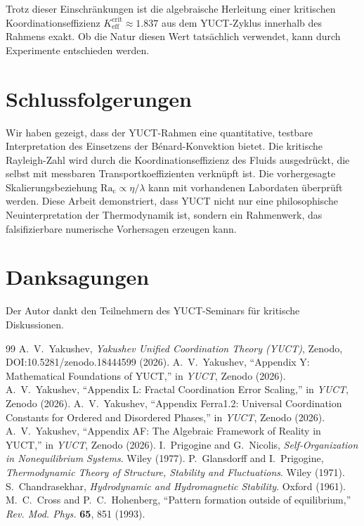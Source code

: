 \documentclass[12pt,a4paper]{article}
\begin{document}
	Trotz dieser Einschränkungen ist die algebraische Herleitung einer kritischen Koordinationseffizienz \(K_{\mathrm{eff}}^{\mathrm{crit}} \approx 1.837\) aus dem YUCT-Zyklus innerhalb des Rahmens exakt. Ob die Natur diesen Wert tatsächlich verwendet, kann durch Experimente entschieden werden.
	
	\section{Schlussfolgerungen}
	
	Wir haben gezeigt, dass der YUCT-Rahmen eine quantitative, testbare Interpretation des Einsetzens der Bénard-Konvektion bietet. Die kritische Rayleigh-Zahl wird durch die Koordinationseffizienz des Fluids ausgedrückt, die selbst mit messbaren Transportkoeffizienten verknüpft ist. Die vorhergesagte Skalierungsbeziehung \(\mathrm{Ra_c} \propto \eta/\lambda\) kann mit vorhandenen Labordaten überprüft werden. Diese Arbeit demonstriert, dass YUCT nicht nur eine philosophische Neuinterpretation der Thermodynamik ist, sondern ein Rahmenwerk, das falsifizierbare numerische Vorhersagen erzeugen kann.
	
	\section*{Danksagungen}
	Der Autor dankt den Teilnehmern des YUCT-Seminars für kritische Diskussionen.
	
	\begin{thebibliography}{99}
		 A.~V.~Yakushev, \emph{Yakushev Unified Coordination Theory (YUCT)}, Zenodo, DOI:10.5281/zenodo.18444599 (2026).
		 A.~V.~Yakushev, ``Appendix Y: Mathematical Foundations of YUCT,'' in \emph{YUCT}, Zenodo (2026).
		 A.~V.~Yakushev, ``Appendix L: Fractal Coordination Error Scaling,'' in \emph{YUCT}, Zenodo (2026).
		 A.~V.~Yakushev, ``Appendix Ferra1.2: Universal Coordination Constants for Ordered and Disordered Phases,'' in \emph{YUCT}, Zenodo (2026).
		 A.~V.~Yakushev, ``Appendix AF: The Algebraic Framework of Reality in YUCT,'' in \emph{YUCT}, Zenodo (2026).
		 I.~Prigogine and G.~Nicolis, \emph{Self‑Organization in Nonequilibrium Systems}. Wiley (1977).
		 P.~Glansdorff and I.~Prigogine, \emph{Thermodynamic Theory of Structure, Stability and Fluctuations}. Wiley (1971).
		 S.~Chandrasekhar, \emph{Hydrodynamic and Hydromagnetic Stability}. Oxford (1961).
		 M.~C.~Cross and P.~C.~Hohenberg, ``Pattern formation outside of equilibrium,'' \emph{Rev. Mod. Phys.} \textbf{65}, 851 (1993).
	\end{thebibliography}
	
\end{document}

